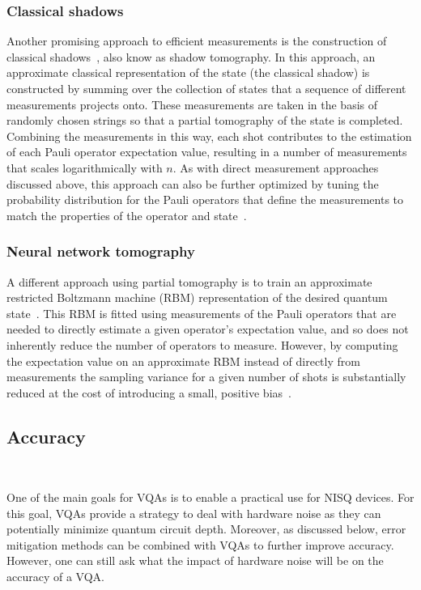 \documentclass[prx,twocolumn,floatfix,superscriptaddress,longbibliography]{revtex4-1}
\newcommand{\<}{\langle}
\renewcommand{\>}{\rangle}
\begin{document}
\subsubsection{ Classical shadows} Another promising approach to efficient measurements is the construction of classical shadows~\cite{huang2020predicting}, also know as shadow tomography. In this approach, an approximate classical representation of the state (the classical shadow) is constructed by summing over the collection of states that a sequence of different measurements projects onto. These measurements are taken in the basis of randomly chosen strings so that a partial tomography of the state is completed. Combining the measurements in this way, each shot contributes to the estimation of each Pauli operator expectation value, resulting in a number of measurements that scales logarithmically with $n$. As with direct measurement approaches discussed above, this approach can also be further optimized by tuning the probability distribution for the Pauli operators that define the measurements to match the properties of the operator and state~\cite{hadfield2020measurements}. 

\subsubsection{ Neural network tomography} A different approach using partial tomography is to train an approximate restricted Boltzmann machine (RBM) representation of the desired quantum state~\cite{torlai2019precise}. This RBM is fitted using measurements of the  Pauli operators that are needed to directly estimate a given operator's expectation value, and so does not inherently reduce the number of operators to measure. However, by computing the expectation value on an approximate RBM instead of directly from measurements the sampling variance for a given number of shots is substantially reduced at the cost of introducing a small, positive bias~\cite{torlai2019precise}. 

\subsection{ Accuracy}~\label{sec:Accuracy}

One of the main goals for VQAs is to enable a practical use for NISQ devices. For this goal, VQAs provide a strategy to deal with hardware noise as they can potentially minimize quantum circuit depth. Moreover, as discussed below, error mitigation methods can be combined with VQAs to further improve accuracy. However, one can still ask what the impact of hardware noise will be on the accuracy of a VQA.  
\end{document}
